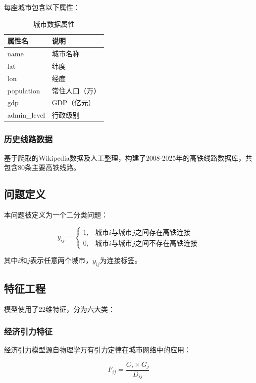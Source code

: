 \documentclass[12pt,a4paper]{article}
\begin{document}
每座城市包含以下属性：
\begin{table}[h]
\centering
\caption{城市数据属性}
\begin{tabular}{ll}
\toprule
属性名 & 说明 \\
\midrule
name & 城市名称 \\
lat & 纬度 \\
lon & 经度 \\
population & 常住人口（万） \\
gdp & GDP（亿元） \\
admin\_level & 行政级别 \\
\bottomrule
\end{tabular}
\end{table}

\subsubsection{历史线路数据}
基于爬取的Wikipedia数据及人工整理，构建了2008-2025年的高铁线路数据库，共包含80条主要高铁线路。

\subsection{问题定义}

本问题被定义为一个二分类问题：

\begin{equation}
y_{ij} = \begin{cases}
1, & \text{城市}i\text{与城市}j\text{之间存在高铁连接} \\
0, & \text{城市}i\text{与城市}j\text{之间不存在高铁连接}
\end{cases}
\end{equation}

其中$i$和$j$表示任意两个城市，$y_{ij}$为连接标签。

\subsection{特征工程}

模型使用了22维特征，分为六大类：

\subsubsection{经济引力特征}
经济引力模型源自物理学万有引力定律在城市网络中的应用：

\begin{equation}
F_{ij} = \frac{G_i \times G_j}{D_{ij}}
\end{equation}
\end{document}
